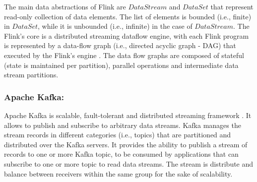 \par The main data abstractions of Flink are $DataStream$ and $DataSet$ that represent read-only collection of data elements. The list of elements is bounded (i.e., finite) in $DataSet$, while it is unbounded (i.e., infinite) in the case of $DataStream$. The Flink's core is a distributed streaming dataflow engine, with each
Flink program is represented by a data-flow graph (i.e., directed acyclic graph - DAG) that executed by the Flink's engine \cite{carbone2015apache}. The data flow graphs are composed of stateful (state is maintained per partition), parallel operations and intermediate data stream partitions.

\subsubsection*{Apache Kafka:\\}

\par Apache Kafka is scalable, fault-tolerant and distributed streaming framework \cite{Kafka}. It allows to publish and subscribe to arbitrary data streams. Kafka manages the stream records in different categories (i.e., topics) that are partitioned and distributed over the Kafka servers. It provides the ability to publish a stream of records to one or more Kafka topic, to be consumed by applications that can subscribe to one or more topic to read data streams. The stream is distribute and balance between receivers within the same group for the sake of scalability.
  





%
